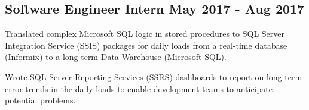 \subsection{{Software Engineer Intern \hfill May 2017 - Aug 2017}}
\begin{zitemize}
\item Translated complex Microsoft SQL logic in stored procedures to SQL Server Integration Service (SSIS) packages for daily loads from a real-time database (Informix) to a long term Data Warehouse (Microsoft SQL).
\item Wrote SQL Server Reporting Services (SSRS) dashboards to report on long term error trends in the daily loads to enable development teams to anticipate potential problems.
\end{zitemize}

